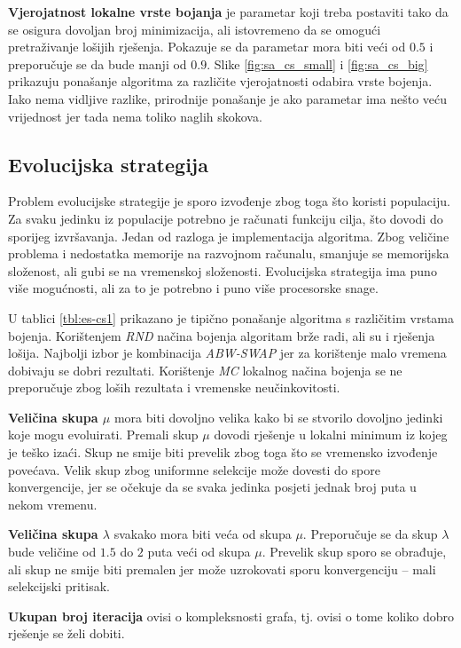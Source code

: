 \documentclass[times, utf8, diplomski, numeric]{fer}
\begin{document}
\textbf{Vjerojatnost lokalne vrste bojanja} je parametar koji treba postaviti tako da se osigura dovoljan broj minimizacija, ali istovremeno da se omogući pretraživanje lošijih rješenja. Pokazuje se da parametar mora biti veći od $0.5$ i preporučuje se da bude manji od $0.9$. Slike \ref{fig:sa_cs_small} i \ref{fig:sa_cs_big} prikazuju ponašanje algoritma za različite vjerojatnosti odabira vrste bojenja. Iako nema vidljive razlike, prirodnije ponašanje je ako parametar ima nešto veću vrijednost jer tada nema toliko naglih skokova.

\subsection{Evolucijska strategija}

Problem evolucijske strategije je sporo izvođenje zbog toga što koristi populaciju. Za svaku jedinku iz populacije potrebno je računati funkciju cilja, što dovodi do sporijeg izvršavanja. Jedan od razloga je implementacija algoritma. Zbog veličine problema i nedostatka memorije na razvojnom računalu, smanjuje se memorijska složenost, ali gubi se na vremenskoj složenosti. Evolucijska strategija ima puno više mogućnosti, ali za to je potrebno i puno više procesorske snage.

U tablici \ref{tbl:es-cs1} prikazano je tipično ponašanje algoritma s različitim vrstama bojenja. Korištenjem \emph{RND} načina bojenja algoritam brže radi, ali su i rješenja lošija. Najbolji izbor je kombinacija \emph{ABW-SWAP} jer za korištenje malo vremena dobivaju se dobri rezultati. Korištenje \emph{MC} lokalnog načina bojenja se ne preporučuje zbog loših rezultata i vremenske neučinkovitosti.

\textbf{Veličina skupa $\mu$} mora biti dovoljno velika kako bi se stvorilo dovoljno jedinki koje mogu evoluirati. Premali skup $\mu$ dovodi rješenje u lokalni minimum iz kojeg je teško izaći. Skup ne smije biti prevelik zbog toga što se vremensko izvođenje povećava. Velik skup zbog uniformne selekcije može dovesti do spore konvergencije, jer se očekuje da se svaka jedinka posjeti jednak broj puta u nekom vremenu.

\textbf{Veličina skupa $\lambda$} svakako mora biti veća od skupa $\mu$. Preporučuje se da skup $\lambda$ bude veličine od $1.5$ do $2$ puta veći od skupa $\mu$. Prevelik skup sporo se obrađuje, ali skup ne smije biti premalen jer može uzrokovati sporu konvergenciju -- mali selekcijski pritisak.

\textbf{Ukupan broj iteracija} ovisi o kompleksnosti grafa, tj. ovisi o tome koliko dobro rješenje se želi dobiti.
\end{document}
